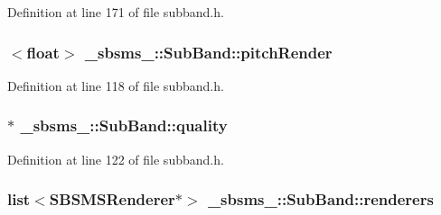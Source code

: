 Definition at line 171 of file subband.\+h.

\subsubsection[{\texorpdfstring{pitch\+Render}{pitchRender}}]{$<$float$>$ \+\_\+sbsms\+\_\+\+::\+Sub\+Band\+::pitch\+Render\hspace{0.3cm}{\ttfamily [protected]}}\hypertarget{class__sbsms___1_1_sub_band_a31e3fbdc7e7e347735cc8fa3543a9b1b}{}\label{class__sbsms___1_1_sub_band_a31e3fbdc7e7e347735cc8fa3543a9b1b}


Definition at line 118 of file subband.\+h.

\subsubsection[{\texorpdfstring{quality}{quality}}]{$\ast$ \+\_\+sbsms\+\_\+\+::\+Sub\+Band\+::quality\hspace{0.3cm}{\ttfamily [protected]}}\hypertarget{class__sbsms___1_1_sub_band_ad9c4865b8b6c0e40f6936f057bc811b7}{}\label{class__sbsms___1_1_sub_band_ad9c4865b8b6c0e40f6936f057bc811b7}


Definition at line 122 of file subband.\+h.

\subsubsection[{\texorpdfstring{renderers}{renderers}}]{\setlength{\rightskip}{0pt plus 5cm}list$<${\bf S\+B\+S\+M\+S\+Renderer}$\ast$$>$ \+\_\+sbsms\+\_\+\+::\+Sub\+Band\+::renderers\hspace{0.3cm}{\ttfamily [protected]}}\hypertarget{class__sbsms___1_1_sub_band_a180d0609f5a12fdcda2b19fd351ccf1c}{}\label{class__sbsms___1_1_sub_band_a180d0609f5a12fdcda2b19fd351ccf1c}


